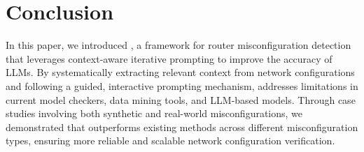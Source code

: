 \section{Conclusion}
\label{sec:conclusion}

In this paper, we introduced \sysname{}, a framework for router misconfiguration detection that leverages context-aware iterative prompting to improve the accuracy of LLMs. By systematically extracting relevant context from network configurations
and following a guided, interactive prompting mechanism, \sysname{} addresses limitations in current model checkers, data mining tools, and LLM-based models. Through case studies involving both synthetic and real-world misconfigurations, we demonstrated that \sysname{} outperforms existing methods across different misconfiguration types, ensuring more reliable and scalable network configuration verification.